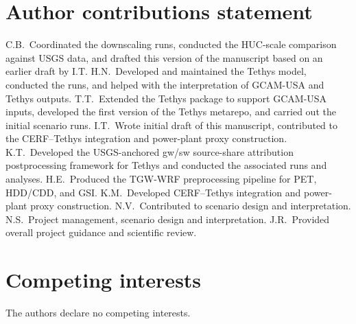 \documentclass[fleqn,10pt]{wlscirep}
\begin{document}
\section*{Author contributions statement}

C.B.~Coordinated the downscaling runs, conducted the HUC-scale comparison against USGS data, and drafted this version of the manuscript based on an earlier draft by I.T.
H.N.~Developed and maintained the Tethys model, conducted the runs, and helped with the interpretation of GCAM-USA and Tethys outputs.
T.T.~Extended the Tethys package to support GCAM-USA inputs, developed the first version of the Tethys metarepo, and carried out the initial scenario runs.
I.T.~Wrote initial draft of this manuscript, contributed to the CERF--Tethys integration and power-plant proxy construction.
K.T.~Developed the USGS-anchored gw/sw source-share attribution postprocessing framework for Tethys and conducted the associated runs and analyses.
H.E.~Produced the TGW-WRF preprocessing pipeline for PET, HDD/CDD, and GSI.
K.M.~Developed CERF--Tethys integration and power-plant proxy construction.
N.V.~Contributed to scenario design and interpretation.
N.S.~Project management, scenario design and interpretation.
J.R.~Provided overall project guidance and scientific review.

\section*{Competing interests}

The authors declare no competing interests.


\end{document}
